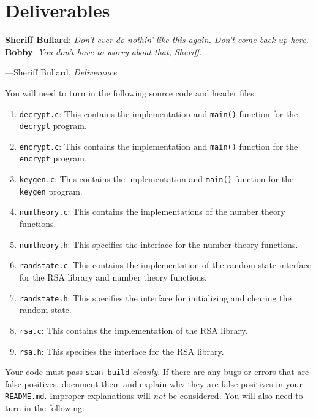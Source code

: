 \section{Deliverables}
\textwidth
\epigraph{\textbf{Sheriff Bullard}: \emph{Don't ever do nothin' like this again. Don't come back up here.} \\
\textbf{Bobby}: \emph{You don't have to worry about that, Sheriff.}}
{---Sheriff Bullard, \emph{Deliverance}}

\noindent You will need to turn in the following source code and header
files:

\begin{enumerate}
  \item \texttt{decrypt.c}: This contains the implementation and
    \texttt{main()} function for the \texttt{decrypt} program.

  \item \texttt{encrypt.c}: This contains the implementation and
    \texttt{main()} function for the \texttt{encrypt} program.

  \item \texttt{keygen.c}: This contains the implementation and
    \texttt{main()} function for the \texttt{keygen} program.

  \item \texttt{numtheory.c}: This contains the implementations of the
    number theory functions.

  \item \texttt{numtheory.h}: This specifies the interface for the
    number theory functions.

  \item \texttt{randstate.c}: This contains the implementation of the
    random state interface for the RSA library and number theory
    functions.

  \item \texttt{randstate.h}: This specifies the interface for
    initializing and clearing the random state.

  \item \texttt{rsa.c}: This contains the implementation of the RSA
    library.

  \item \texttt{rsa.h}: This specifies the interface for the RSA
    library.
\end{enumerate}

Your code must pass \texttt{scan-build} \emph{cleanly}. If there are any
bugs or errors that are false positives, document them and explain why
they are false positives in your \texttt{README.md}. Improper
explanations will \emph{not} be considered. You will also need to turn
in the following:

